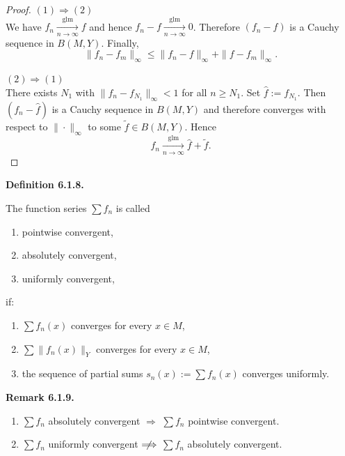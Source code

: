 \documentclass[12pt]{article}
\newenvironment{definition}[1]{%
  \par\vspace{6pt}\noindent\textbf{Definition #1.}\itshape\space
}{%
  \par\vspace{6pt}
}
\newenvironment{bemerkung}[1]{%
  \par\vspace{6pt}\noindent\textbf{Remark #1.}\itshape\space
}{%
  \par\vspace{6pt}
}
\begin{document}
\begin{proof}
$(1)\Longrightarrow(2)$\\
We have $f_n \xrightarrow[n\to\infty]{\mathrm{glm}} f$ and hence
$f_n-f \xrightarrow[n\to\infty]{\mathrm{glm}} 0$.
Therefore $(f_n-f)$ is a Cauchy sequence in $B(M,Y)$. Finally,
\[
\|f_n-f_m\|_\infty\le \|f_n-f\|_\infty+\|f-f_m\|_\infty.
\]

$(2)\Longrightarrow(1)$\\
There exists $N_1$ with $\|f_n-f_{N_1}\|_\infty<1$ for all $n\ge N_1$.
Set $\hat f:=f_{N_1}$. Then $(f_n-\hat f)$ is a Cauchy sequence in $B(M,Y)$ and
therefore converges with respect to $\|\cdot\|_\infty$ to some $\tilde f\in B(M,Y)$.
Hence
\[
f_n \xrightarrow[n\to\infty]{\mathrm{glm}} \hat f+\tilde f.
\]
\end{proof}

\begin{definition}{6.1.8}
The function series $\sum f_n$ is called
\begin{enumerate}
    \item pointwise convergent,
    \item absolutely convergent,
    \item uniformly convergent,
\end{enumerate}
if:
\begin{enumerate}
    \item $\sum f_n(x)$ converges for every $x\in M$,
    \item $\sum \|f_n(x)\|_Y$ converges for every $x\in M$,
    \item the sequence of partial sums $s_n(x):=\sum f_n(x)$ converges uniformly.
\end{enumerate}
\end{definition}

\begin{bemerkung}{6.1.9}
\hfill
\begin{enumerate}
    \item $\sum f_n$ absolutely convergent $\Longrightarrow$ $\sum f_n$ pointwise convergent.
    \item $\sum f_n$ uniformly convergent $\centernot\Longrightarrow$ $\sum f_n$ absolutely convergent.
\end{enumerate}
\end{bemerkung}
\end{document}
